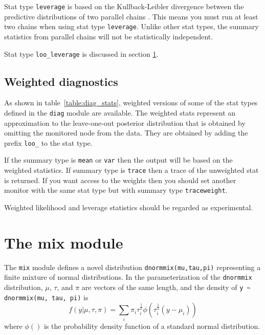 \documentclass[11pt, a4paper, titlepage]{report}
\begin{document}
{Stat type \texttt{leverage} is based on the Kullback-Leibler
divergence between the predictive distributions of two parallel chains
\citep{Plummer2025}. This means you must run at least two chains when
using stat type \texttt{leverage}. Unlike other stat types, the
summary statistics from parallel chains will not be statistically
independent.

Stat type \texttt{loo\_leverage} is discussed in section
\ref{section:loo}.

\section{Weighted diagnostics}
\label{section:loo}

As shown in table~\ref{table:diag_stats}, weighted versions of some of
the stat types defined in the \texttt{diag} module are available.  The
weighted stats represent an approximation to the leave-one-out
posterior distribution that is obtained by omitting the monitored node
from the data. They are obtained by adding the prefix \texttt{loo\_}
to the stat type.

If the summary type is \texttt{mean} or \texttt{var} then the output
will be based on the weighted statistics. If summary type is
\texttt{trace} then a trace of the unweighted stat is returned. If you
want access to the weights then you should set another monitor with
the same stat type but with summary type \texttt{traceweight}.

Weighted likelihood and leverage statistics should be regarded as
experimental.

\chapter{The mix module}

The \texttt{mix} module defines a novel distribution
\verb+dnormmix(mu,tau,pi)+ representing a finite mixture of normal
distributions. In the parameterization of the \verb+dnormmix+
distribution, $\mu$, $\tau$, and $\pi$ are vectors of the same length,
and the density of \verb+y ~ dnormmix(mu, tau, pi)+ is
\[
f(y | \mu, \tau, \pi) = \sum_i \pi_i \tau_i^{\frac{1}{2}} \phi( \tau^{\frac{1}{2}}_i (y - \mu_i))
\]
where $\phi()$ is the probability density function of a standard
normal distribution.

}
\end{document}
